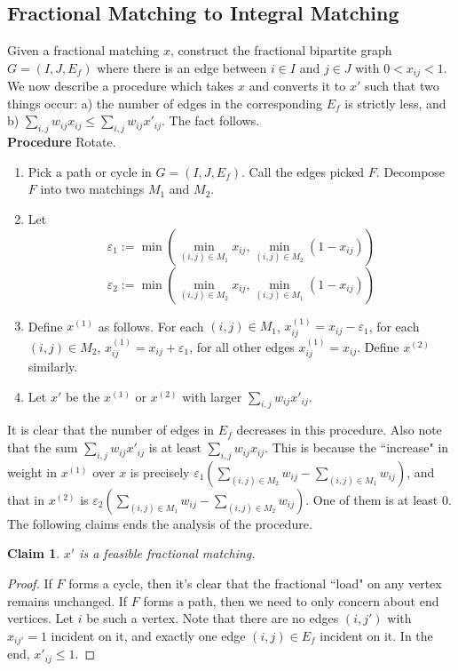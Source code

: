 \documentclass[11pt]{article}
\newtheorem{claim}{Claim}
\def\eps{\varepsilon}
\begin{document}
\subsection{Fractional Matching to Integral Matching}
Given a fractional matching $x$, construct the fractional bipartite graph
$G=(I,J,E_f)$ where there is an edge between $i\in I$ and $j\in J$ with $0<x_{ij}<1$.
We now describe a procedure which takes $x$ and converts it to $x'$ such that two things occur:
a) the number of edges in the corresponding $E_f$ is strictly less, and b) $\sum_{i,j} w_{ij}x_{ij} \le \sum_{i,j} w_{ij}x'_{ij}$. The fact follows. \\

\noindent
{\bf Procedure }{\sc Rotate.}
\begin{enumerate}
\item Pick a path or cycle in $G = (I,J,E_f)$. Call the edges picked $F$. Decompose $F$ into two matchings
$M_1$ and $M_2$.
\item Let $$\eps_1 := \min\left( \min_{(i,j) \in M_1} x_{ij}, \min_{(i,j)\in M_2} (1-x_{ij}) \right)$$
$$\eps_2 := \min\left( \min_{(i,j) \in M_2} x_{ij}, \min_{(i,j)\in M_1} (1-x_{ij}) \right)$$
\item Define  $x^{(1)}$ as follows. 
	For each $(i,j)\in M_1$, $x^{(1)}_{ij} = x_{ij} - \eps_1$,
	for each $(i,j)\in M_2$, $x^{(1)}_{ij} = x_{ij} + \eps_1$,
	for all other edges $x^{(1)}_{ij} = x_{ij}$. Define $x^{(2)}$ similarly. 
\item Let $x'$ be the $x^{(1)}$ or $x^{(2)}$ with larger $\sum_{i,j}w_{ij}x'_{ij}$. 
\end{enumerate}

\noindent
It is clear that the number of edges in $E_f$ decreases in this procedure. Also note that the sum $\sum_{i,j}w_{ij}x'_{ij}$ is at least $\sum_{i,j} w_{ij}x_{ij}$. This is because the ``increase" in weight in $x^{(1)}$ over $x$ is precisely $\eps_1\left(\sum_{(i,j)\in M_2} w_{ij} - \sum_{(i,j)\in M_1}w_{ij}\right)$, and that in $x^{(2)}$ is 
$\eps_2\left(\sum_{(i,j)\in M_1} w_{ij} - \sum_{(i,j)\in M_2}w_{ij}\right)$. One of them is at least $0$.
The following claims ends the analysis of the procedure.

\begin{claim}
$x'$ is a feasible fractional matching.
\end{claim}
\begin{proof}
If $F$ forms a cycle, then it's clear that the fractional ``load" on any vertex remains unchanged.
If $F$ forms a path, then we need to only concern about end vertices. Let $i$ be such a vertex.
Note that there are no edges $(i,j')$ with $x_{ij'} = 1$ incident on it, 
and exactly one edge $(i,j)\in E_f$ incident on it. In the end, $x'_{ij} \le 1$.
\end{proof}







 
\end{document}
